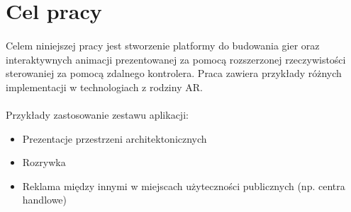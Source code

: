 \section{Cel pracy}
\paragraph{}
Celem niniejszej pracy jest stworzenie platformy do budowania gier oraz interaktywnych animacji prezentowanej za pomocą rozszerzonej rzeczywistości sterowaniej za pomocą zdalnego kontrolera. Praca zawiera przykłady różnych implementacji w technologiach z rodziny AR.

\paragraph{}
Przykłady zastosowanie zestawu aplikacji:

\begin{itemize}
	\item Prezentacje przestrzeni architektonicznych
	\item Rozrywka
	\item Reklama między innymi w miejscach użyteczności publicznych (np. centra handlowe)
\end{itemize}

